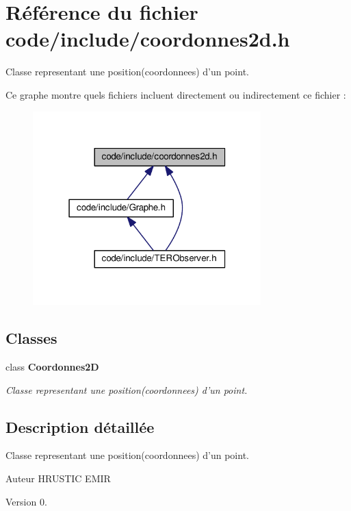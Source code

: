 \section{Référence du fichier code/include/coordonnes2d.h}
\label{coordonnes2d_8h}


Classe representant une position(coordonnees) d'un point.  


Ce graphe montre quels fichiers incluent directement ou indirectement ce fichier \-:
\nopagebreak
\begin{figure}[H]
\begin{center}
\leavevmode
\includegraphics[width=250pt]{coordonnes2d_8h__dep__incl}
\end{center}
\end{figure}
\subsection*{Classes}
\begin{DoxyCompactItemize}
\item 
class {\bf Coordonnes2\-D}
\begin{DoxyCompactList}\small\item\em Classe representant une position(coordonnees) d'un point. \end{DoxyCompactList}\end{DoxyCompactItemize}


\subsection{Description détaillée}
Classe representant une position(coordonnees) d'un point. \begin{DoxyAuthor}{Auteur}
H\-R\-U\-S\-T\-I\-C E\-M\-I\-R 
\end{DoxyAuthor}
\begin{DoxyVersion}{Version}
0. 
\end{DoxyVersion}
